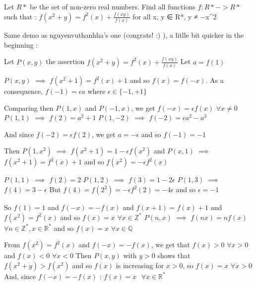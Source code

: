 \begin{solution}
	\begin{tcolorbox}Let $ R*$ be the set of non-zero real numbers. Find all functions $ f : R* - > R*$ such that : $ f(x^2 + y) = f^2(x) + \frac {f(xy)}{f(x)}$
for all x, y ∈ R*, y ≠ −x^2\end{tcolorbox}
Same demo as nguyenvuthanhha's one (congrats!  :) ), a litlle bit quicker in the beginning :

Let $ P(x,y)$ the assertion $ f(x^2+y)=f^2(x)+\frac{f(xy)}{f(x)}$
Let $ a=f(1)$

$ P(x,y)$ $ \implies$ $ f(x^2+1)=f^2(x)+1$ and so $ f(x)=f(-x)$. As a consequence, $ f(-1)=\epsilon a$ where $ \epsilon\in\{-1,+1\}$

Comparing then $ P(1,x)$ and $ P(-1,x)$, we get $ f(-x)=\epsilon f(x)$ $ \forall x\neq 0$
$ P(1,1)$ $ \implies$ $ f(2)=a^2+1$
$ P(1,-2)$ $ \implies$ $ f(-2)=\epsilon a^2-a^3$

And since $ f(-2)=\epsilon f(2)$, we get $ a=-\epsilon$ and so $ f(-1)=-1$

Then $ P(1,x^2)$ $ \implies$ $ f(x^2+1)=1-\epsilon f(x^2)$ and $ P(x,1)$ $ \implies$ $ f(x^2+1)=f^2(x)+1$ and so $ f(x^2)=-\epsilon f^2(x)$

$ P(1,1)$ $ \implies$ $ f(2)=2$
$ P(1,2)$ $ \implies$ $ f(3)=1-2\epsilon$
$ P(1,3)$ $ \implies$ $ f(4)=3-\epsilon$ But $ f(4)=f(2^2)=-\epsilon f^2(2)=-4\epsilon$ and so $ \epsilon=-1$

So $ f(1)=1$ and $ f(-x)=-f(x)$ and $ f(x+1)=f(x)+1$ and $ f(x^2)=f^2(x)$ and so $ f(x)=x$ $ \forall x\in\mathbb Z^*$
$ P(n,x)$ $ \implies$ $ f(nx)=nf(x)$ $ \forall n\in\mathbb Z^*,x\in\mathbb R^*$ and so $ f(x)=x$ $ \forall x\in\mathbb Q$

From $ f(x^2)=f^2(x)$ and $ f(-x)=-f(x)$, we get that $ f(x)>0$ $ \forall x>0$ and $ f(x)<0$ $ \forall x<0$
Then $ P(x,y)$ with $ y>0$ shows that $ f(x^2+y)>f(x^2)$ and so $ f(x)$ is increasing for $ x>0$, so $ f(x)=x$ $ \forall x>0$
And, since $ f(-x)=-f(x)$ : $ \boxed{f(x)=x\text{   }\forall x\in\mathbb R^*}$
\end{solution}






